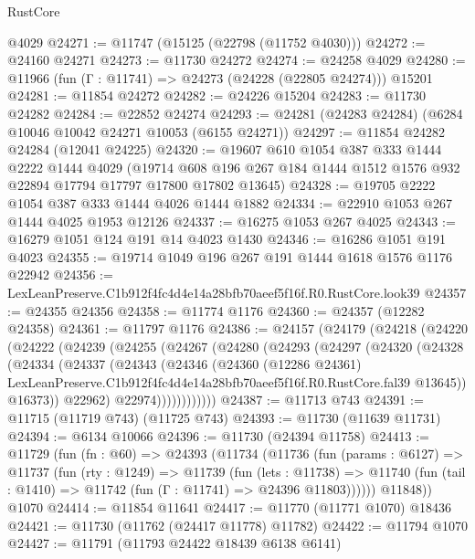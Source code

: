 \begin{lexlean}{RustCore}
\begin{coremodule}
    @4029
@24271 := @11747 (@15125 (@22798 (@11752 @4030)))
@24272 := @24160 @24271
@24273 := @11730 @24272
@24274 := @24258 @4029
@24280 := @11966 (fun (Γ : @11741) => @24273 (@24228 (@22805 @24274))) @15201
@24281 := @11854 @24272
@24282 := @24226 @15204
@24283 := @11730 @24282
@24284 := @22852 @24274
@24293 := @24281 (@24283 @24284) (@6284 @10046 @10042 @24271 @10053 (@6155 @24271))
@24297 := @11854 @24282 @24284 (@12041 @24225)
@24320 := @19607
    @610
    @1054
    @387
    @333
    @1444
    @2222
    @1444
    @4029
    (@19714 @608 @196 @267 @184 @1444 @1512 @1576 @932 @22894 @17794 @17797 @17800 @17802 @13645)
@24328 := @19705 @2222 @1054 @387 @333 @1444 @4026 @1444 @1882
@24334 := @22910 @1053 @267 @1444 @4025 @1953 @12126
@24337 := @16275 @1053 @267 @4025
@24343 := @16279 @1051 @124 @191 @14 @4023 @1430
@24346 := @16286 @1051 @191 @4023
@24355 := @19714 @1049 @196 @267 @191 @1444 @1618 @1576 @1176 @22942
@24356 := LexLeanPreserve.C1b912f4fc4d4e14a28bfb70aeef5f16f.R0.RustCore.look39
@24357 := @24355 @24356
@24358 := @11774 @1176
@24360 := @24357 (@12282 @24358)
@24361 := @11797 @1176
@24386 := @24157
    (@24179
      (@24218
        (@24220
          (@24222
            (@24239
              (@24255
                (@24267
                  (@24280
                    (@24293
                      (@24297
                        (@24320
                          (@24328
                            (@24334
                              (@24337
                                (@24343
                                  (@24346
                                    (@24360
                                      (@12286 @24361)
                                      LexLeanPreserve.C1b912f4fc4d4e14a28bfb70aeef5f16f.R0.RustCore.fal39
                                      @13645))
                                  @16373))
                              @22962)
                            @22974))))))))))))
@24387 := @11713 @743
@24391 := @11715 (@11719 @743) (@11725 @743)
@24393 := @11730 (@11639 @11731)
@24394 := @6134 @10066
@24396 := @11730 (@24394 @11758)
@24413 := @11729
    (fun (fn : @60) =>
    @24393
      (@11734
        (@11736
          (fun (params : @6127) =>
          @11737
            (fun (rty : @1249) =>
            @11739
              (fun (lets : @11738) =>
              @11740 (fun (tail : @1410) => @11742 (fun (Γ : @11741) => @24396 @11803))))))
        @11848))
    @1070
@24414 := @11854 @11641
@24417 := @11770 (@11771 @1070) @18436
@24421 := @11730 (@11762 (@24417 @11778) @11782)
@24422 := @11794 @1070
@24427 := @11791 (@11793 @24422 @18439 @6138 @6141)

\end{coremodule}
\end{lexlean}
